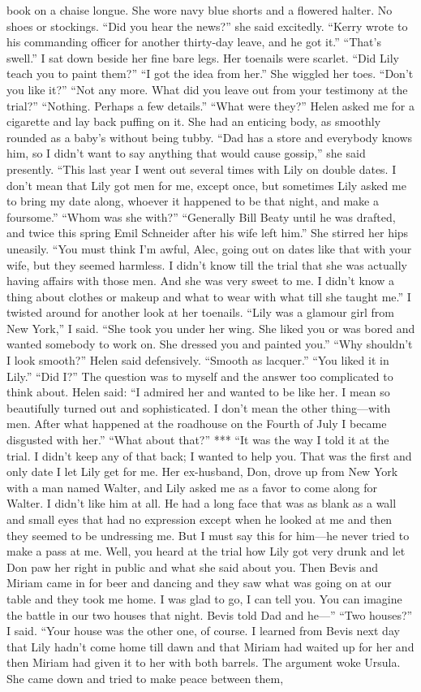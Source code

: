 \documentclass{novel}
\begin{document}
book on a chaise longue. She wore navy blue shorts and a flowered halter. No shoes or stockings. “Did you hear the news?” she said excitedly. “Kerry wrote to his commanding officer for another thirty-day leave, and he got it.” “That’s swell.” I sat down beside her fine bare legs. Her toenails were scarlet. “Did Lily teach you to paint them?” “I got the idea from her.” She wiggled her toes. “Don’t you like it?” “Not any more. What did you leave out from your testimony at the trial?” “Nothing. Perhaps a few details.” “What were they?” Helen asked me for a cigarette and lay back puffing on it. She had an enticing body, as smoothly rounded as a baby’s without being tubby. “Dad has a store and everybody knows him, so I didn’t want to say anything that would cause gossip,” she said presently. “This last year I went out several times with Lily on double dates. I don’t mean that Lily got men for me, except once, but sometimes Lily asked me to bring my date along, whoever it happened to be that night, and make a foursome.” “Whom was she with?” “Generally Bill Beaty until he was drafted, and twice this spring Emil Schneider after his wife left him.” She stirred her hips uneasily. “You must think I’m awful, Alec, going out on dates like that with your wife, but they seemed harmless. I didn’t know till the trial that she was actually having affairs with those men. And she was very sweet to me. I didn’t know a thing about clothes or makeup and what to wear with what till she taught me.” I twisted around for another look at her toenails. “Lily was a glamour girl from New York,” I said. “She took you under her wing. She liked you or was bored and wanted somebody to work on. She dressed you and painted you.” “Why shouldn’t I look smooth?” Helen said defensively. “Smooth as lacquer.” “You liked it in Lily.” “Did I?” The question was to myself and the answer too complicated to think about. Helen said: “I admired her and wanted to be like her. I mean so beautifully turned out and sophisticated. I don’t mean the other thing—with men. After what happened at the roadhouse on the Fourth of July I became disgusted with her.” “What about that?” *** “It was the way I told it at the trial. I didn’t keep any of that back; I wanted to help you. That was the first and only date I let Lily get for me. Her ex-husband, Don, drove up from New York with a man named Walter, and Lily asked me as a favor to come along for Walter. I didn’t like him at all. He had a long face that was as blank as a wall and small eyes that had no expression except when he looked at me and then they seemed to be undressing me. But I must say this for him—he never tried to make a pass at me. Well, you heard at the trial how Lily got very drunk and let Don paw her right in public and what she said about you. Then Bevis and Miriam came in for beer and dancing and they saw what was going on at our table and they took me home. I was glad to go, I can tell you. You can imagine the battle in our two houses that night. Bevis told Dad and he—” “Two houses?” I said. “Your house was the other one, of course. I learned from Bevis next day that Lily hadn’t come home till dawn and that Miriam had waited up for her and then Miriam had given it to her with both barrels. The argument woke Ursula. She came down and tried to make peace between them, 
\end{document}
